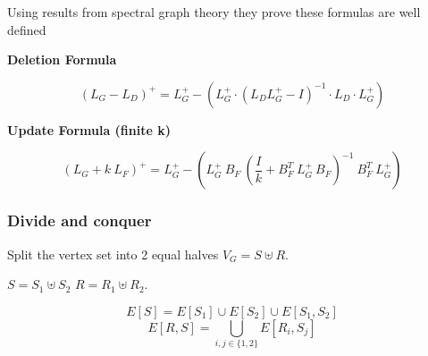 \documentclass{beamer}
\newcommand{\laplacian}[1][G]{\ensuremath{L_{#1}^{+}}}
\begin{document}
\begin{frame}

Using results from spectral graph theory they prove these formulas are well defined

 
 \leavevmode\hphantom{ }
 \leavevmode\hphantom{ }
 

\textbf{Deletion Formula} 

 
 $$ (L_G - L_D)^+ = \laplacian - \left( \laplacian \cdot (L_D\laplacian-I)^{-1} \cdot L_D \cdot \laplacian\right)$$
 
 \textbf{Update Formula (finite k)}
 
 $$ (L_G + k \ L_F)^+ = \laplacian - \left(\laplacian \  B_F \  (\frac{I}{k} + B_F^T \ \laplacian \ B_F)^{-1} \  B_F^T \  \laplacian \right)$$
 
 
\end{frame}


\begin{frame}
 \frametitle{Divide and conquer}
 
Split the vertex set into 2 equal halves $V_G = S \uplus R$. 

 
 \leavevmode\hphantom{ }
 \leavevmode\hphantom{ }
 

$S = S_1 \uplus S_2$  $R = R_1 \uplus R_2$. 
 
 \leavevmode\hphantom{ }
 \leavevmode\hphantom{ }
 

$$ E[S] = E[S_1] \cup E[S_2] \cup E[S_1, S_2] $$ 
$$ E[R, S] = \bigcup\limits_{i,j \in \{1,2\} } E[R_i, S_j] $$

 
\end{frame}
\end{document}
